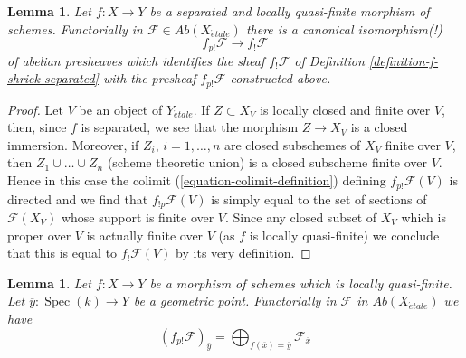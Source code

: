 \documentclass{stacks-project}
\theoremstyle{plain}
\newtheorem{lemma}[subsection]{Lemma}
\theoremstyle{definition}
\theoremstyle{remark}
\numberwithin{equation}{subsection}
\def\Spec{\mathop{\mathrm{Spec}}}
\def\etale{{\acute{e}tale}}
\begin{document}
\begin{lemma}
\label{lemma-finite-support-f-shriek-separated}
Let $f : X \to Y$ be a separated and locally quasi-finite morphism
of schemes. Functorially in $\mathcal{F} \in \textit{Ab}(X_\etale)$
there is a canonical isomorphism(!)
$$
f_{p!}\mathcal{F} \longrightarrow f_!\mathcal{F}
$$
of abelian presheaves which identifies the sheaf
$f_!\mathcal{F}$ of Definition \ref{definition-f-shriek-separated}
with the presheaf $f_{p!}\mathcal{F}$ constructed above.
\end{lemma}

\begin{proof}
Let $V$ be an object of $Y_\etale$. If $Z \subset X_V$ is locally closed
and finite over $V$, then, since $f$ is separated, we see that
the morphism $Z \to X_V$ is a closed immersion. Moreover, if
$Z_i$, $i = 1, \ldots, n$ are closed subschemes of $X_V$ finite
over $V$, then $Z_1 \cup \ldots \cup Z_n$ (scheme theoretic union)
is a closed subscheme finite over $V$. Hence in this case the colimit
(\ref{equation-colimit-definition}) defining $f_{p!}\mathcal{F}(V)$
is directed and we find that $f_{!p}\mathcal{F}(V)$ is simply equal
to the set of sections of $\mathcal{F}(X_V)$ whose support is finite over $V$.
Since any closed subset of $X_V$ which is proper over $V$ is
actually finite over $V$ (as $f$ is locally quasi-finite)
we conclude that this is equal to $f_!\mathcal{F}(V)$
by its very definition.
\end{proof}

\begin{lemma}
\label{lemma-finite-support-stalk}
Let $f : X \to Y$ be a morphism of schemes which is locally quasi-finite.
Let $\overline{y} : \Spec(k) \to Y$ be a geometric point.
Functorially in $\mathcal{F}$ in $\textit{Ab}(X_\etale)$ we have
$$
(f_{p!}\mathcal{F})_{\overline{y}} =
\bigoplus\nolimits_{f(\overline{x}) = \overline{y}} \mathcal{F}_{\overline{x}}
$$
\end{lemma}
\end{document}
